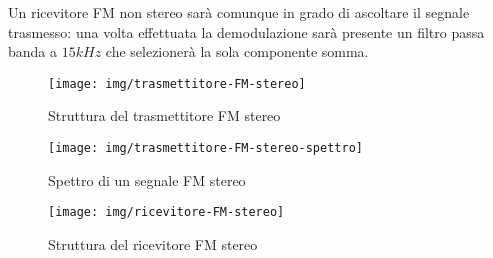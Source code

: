 Un ricevitore FM non stereo sarà comunque in grado di ascoltare il segnale trasmesso: una volta effettuata la demodulazione sarà presente un filtro passa banda a $15kHz$ che selezionerà la sola componente somma.

\begin{figure}[hbt]
	\centering
	\texttt{[image: img/trasmettitore-FM-stereo]}
	\caption{Struttura del trasmettitore FM stereo}
	\label{fig:tx-fm-stereo}
\end{figure}

\begin{figure}[hbt]
	\centering
	\texttt{[image: img/trasmettitore-FM-stereo-spettro]}
	\caption{Spettro di un segnale FM stereo}
	\label{fig:spettro-fm-stereo}
\end{figure}

\begin{figure}[hbt]
	\centering
	\texttt{[image: img/ricevitore-FM-stereo]}
	\caption{Struttura del ricevitore FM stereo}
	\label{fig:rx-fm-stereo}
\end{figure}
%
%
%
